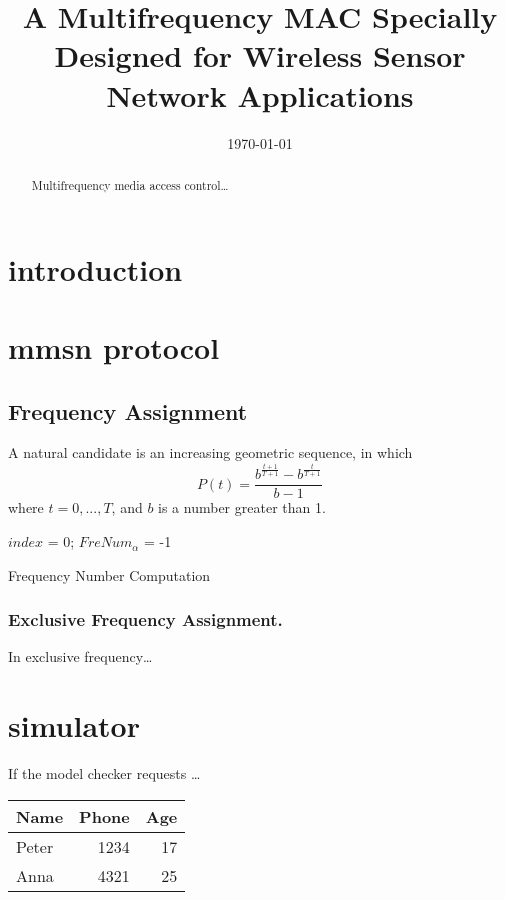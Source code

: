 \documentclass[acmtog]{acmart}
\date{\today}
\title{A Multifrequency MAC Specially Designed for Wireless Sensor Network Applications}
\begin{document}
\maketitle
\begin{abstract}
Multifrequency media access control\ldots{}
\end{abstract}
\section{introduction}
\label{sec:orgd994049}
\section{mmsn protocol}
\label{sec:orgaa1e2ba}
\subsection{Frequency Assignment}
\label{sec:orge87b329}
A natural candidate is an increasing geometric sequence, in which
\begin{equation}
P(t)=\frac{b^{\frac{t+1}{T+1}}-b^{\frac{t}{T+1}}}{b-1}
\end{equation}
where \(t = 0,...,T\), and \(b\) is a number greater than 1.\\
\begin{algorithm}[t]
\SetAlgoNoLine
{}
$index$ = 0; $FreNum_{\alpha}$ = -1\;
\caption{Frequency Number Computation}
\label{alg:one}
\end{algorithm}
\subsubsection{Exclusive Frequency Assignment.}
\label{sec:org1b01dc8}
In exclusive frequency\ldots{}
\section{simulator}
\label{sec:org5024f57}
If the model checker requests \ldots{}

\begin{center}
\begin{tabular}{lrr}
Name & Phone & Age\\
\hline
Peter & 1234 & 17\\
Anna & 4321 & 25\\
\end{tabular}
\end{center}
\end{document}
